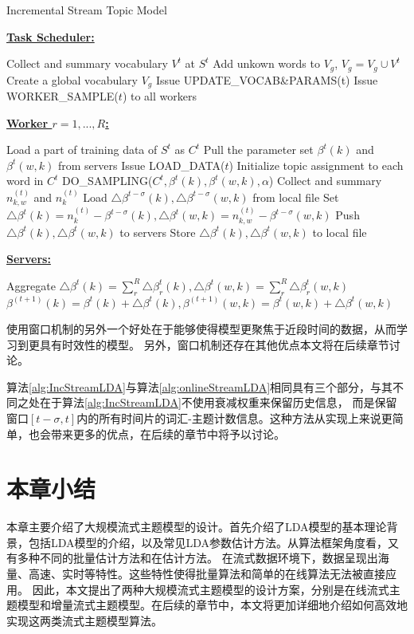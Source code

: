 \begin{algorithm}
\caption{Incremental Stream Topic Model}
\label{alg:IncStreamLDA}
\textbf{\underline{Task Scheduler:}}
\begin{algorithmic}[1]
\State Collect and summary vocabulary $V^t$ at $S^t$
\State Add unkown words to $V_g$, $V_g = V_g \cup V^t$
\EndFunction
\State Create a global vocabulary $V_g$
\State Issue UPDATE\_VOCAB\&PARAMS(t)
\State Issue WORKER\_SAMPLE($t$) to all workers
\EndFor
\end{algorithmic}
\textbf{\underline{Worker $r = 1, ..., R$:}}
\begin{algorithmic}[1]
\State Load a part of training data of $S^t$ as $C^t$
\State Pull the parameter set $\beta^t(k)$ and $\beta^t(w, k)$ from servers
\EndFunction
{}
\State Issue LOAD\_DATA($t$)
\State Initialize topic assignment to each word in $C^t$ 
\State DO\_SAMPLING($C^t, \beta^t(k), \beta^t(w, k), \alpha$)
\EndFor
\State Collect and summary $n_{k,w}^{(t)}$ and $n_{k}^{(t)}$
\State Load $\bigtriangleup \beta^{t - \sigma}(k), \bigtriangleup \beta^{t - \sigma}(w, k)$ from local file
\State Set $\bigtriangleup \beta^t(k) = n_{k}^{(t)} - \beta^{t - \sigma}(k), \bigtriangleup \beta^t(w, k) = n_{k,w}^{(t)} - \beta^{t - \sigma}(w, k)$ 
\State Push $\bigtriangleup \beta^t(k), \bigtriangleup \beta^t(w, k)$ to servers
\State Store $\bigtriangleup \beta^t(k), \bigtriangleup \beta^t(w, k)$ to local file
\EndFunction
\end{algorithmic}
\textbf{\underline{Servers:}}
\begin{algorithmic}[1]
\State Aggregate $\bigtriangleup \beta^t(k) = \sum_r^R{\bigtriangleup \beta^t_r(k)}, \bigtriangleup \beta^t(w, k) = \sum_r^R{\bigtriangleup \beta^t_r(w, k)}$
\State $\beta^{(t+1)}(k) =\beta^t(k) +  \bigtriangleup \beta^t(k), \beta^{(t+1)}(w, k) = \beta^t(w, k) + \bigtriangleup \beta^t(w, k)$
\EndFunction
\end{algorithmic}
\end{algorithm}  

使用窗口机制的另外一个好处在于能够使得模型更聚焦于近段时间的数据，从而学习到更具有时效性的模型。
另外，窗口机制还存在其他优点本文将在后续章节讨论。

算法\ref{alg:IncStreamLDA}与算法\ref{alg:onlineStreamLDA}相同具有三个部分，与其不同之处在于算法\ref{alg:IncStreamLDA}不使用衰减权重来保留历史信息，
而是保留窗口$[t - \sigma, t]$内的所有时间片的词汇-主题计数信息。这种方法从实现上来说更简单，也会带来更多的优点，在后续的章节中将予以讨论。
\section{本章小结}
本章主要介绍了大规模流式主题模型的设计。首先介绍了LDA模型的基本理论背景，包括LDA模型的介绍，以及常见LDA参数估计方法。从算法框架角度看，又有多种不同的批量估计方法和在估计方法。
在流式数据环境下，数据呈现出海量、高速、实时等特性。这些特性使得批量算法和简单的在线算法无法被直接应用。
因此，本文提出了两种大规模流式主题模型的设计方案，分别是在线流式主题模型和增量流式主题模型。在后续的章节中，本文将更加详细地介绍如何高效地实现这两类流式主题模型算法。
